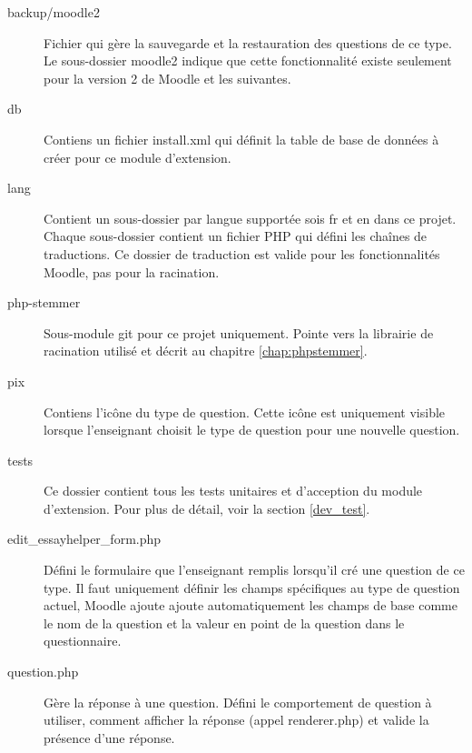 \begin{description}
 \item[backup/moodle2]
 
 Fichier qui g\`ere la sauvegarde et la restauration des questions de ce type.
 Le sous-dossier moodle2 indique que cette fonctionnalit\'e existe seulement pour la version 2 de Moodle et les suivantes.
 
 \item[db]
 
 Contiens un fichier \og install.xml \fg{} qui d\'efinit la table de base de donn\'ees \`a cr\'eer pour ce module d'extension.
 
 \item[lang]
 
 Contient un sous-dossier par langue support\'ee sois \og fr \fg{} et \og en \fg{} dans ce projet.
 Chaque sous-dossier contient un fichier PHP qui d\'efini les cha\^ines de traductions.
 Ce dossier de traduction est valide pour les fonctionnalit\'es Moodle, pas pour la racination.
 
 \item[php-stemmer]
 
 Sous-module git pour ce projet uniquement.
 Pointe vers la librairie de racination utilis\'e et d\'ecrit au chapitre \ref{chap:phpstemmer}.
 
 \item[pix]
 
 Contiens l'ic\^one du type de question.
 Cette ic\^one est uniquement visible lorsque l'enseignant choisit le type de question pour une nouvelle question.
 
 \item[tests]
 
 Ce dossier contient tous les tests unitaires et d'acception du module d'extension.
 Pour plus de d\'etail, voir la section \ref{dev_test}.
 
 \item[edit\_essayhelper\_form.php]
 
 D\'efini le formulaire que l'enseignant remplis lorsqu'il cr\'e une question de ce type.
 Il faut uniquement d\'efinir les champs sp\'ecifiques au type de question actuel, Moodle ajoute ajoute automatiquement les champs de base comme le nom de la question et la valeur en point de la question dans le questionnaire.
 
 \item[question.php]
 
 G\`ere la r\'eponse \`a une question.
 D\'efini le comportement de question \`a utiliser, comment afficher la r\'eponse (appel renderer.php) et valide la pr\'esence d'une r\'eponse.
 

\end{description}
